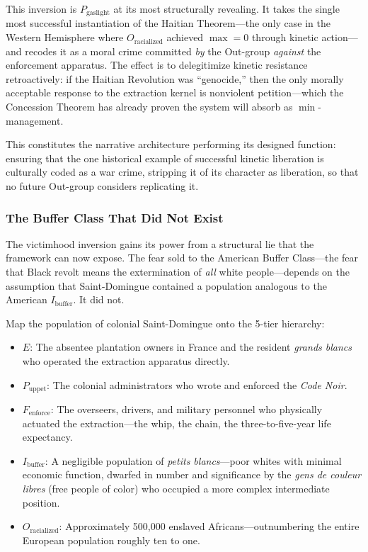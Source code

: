 This inversion is $P_{\text{gaslight}}$ at its most structurally revealing. It takes the single most successful instantiation of the Haitian Theorem---the only case in the Western Hemisphere where $O_{\text{racialized}}$ achieved $\max = 0$ through kinetic action---and recodes it as a moral crime committed \textit{by} the Out-group \textit{against} the enforcement apparatus. The effect is to delegitimize kinetic resistance retroactively: if the Haitian Revolution was ``genocide,'' then the only morally acceptable response to the extraction kernel is nonviolent petition---which the Concession Theorem has already proven the system will absorb as $\min$-management.

This constitutes the narrative architecture performing its designed function: ensuring that the one historical example of successful kinetic liberation is culturally coded as a war crime, stripping it of its character as liberation, so that no future Out-group considers replicating it.

\subsubsection*{The Buffer Class That Did Not Exist}

The victimhood inversion gains its power from a structural lie that the framework can now expose. The fear sold to the American Buffer Class---the fear that Black revolt means the extermination of \textit{all} white people---depends on the assumption that Saint-Domingue contained a population analogous to the American $I_{\text{buffer}}$. It did not.

Map the population of colonial Saint-Domingue onto the 5-tier hierarchy:
\begin{itemize}
    \item \textbf{$E$}: The absentee plantation owners in France and the resident \textit{grands blancs} who operated the extraction apparatus directly.
    \item \textbf{$P_{\text{uppet}}$}: The colonial administrators who wrote and enforced the \textit{Code Noir}.
    \item \textbf{$F_{\text{enforce}}$}: The overseers, drivers, and military personnel who physically actuated the extraction---the whip, the chain, the three-to-five-year life expectancy.
    \item \textbf{$I_{\text{buffer}}$}: A negligible population of \textit{petits blancs}---poor whites with minimal economic function, dwarfed in number and significance by the \textit{gens de couleur libres} (free people of color) who occupied a more complex intermediate position.
    \item \textbf{$O_{\text{racialized}}$}: Approximately 500,000 enslaved Africans---outnumbering the entire European population roughly ten to one.
\end{itemize}

